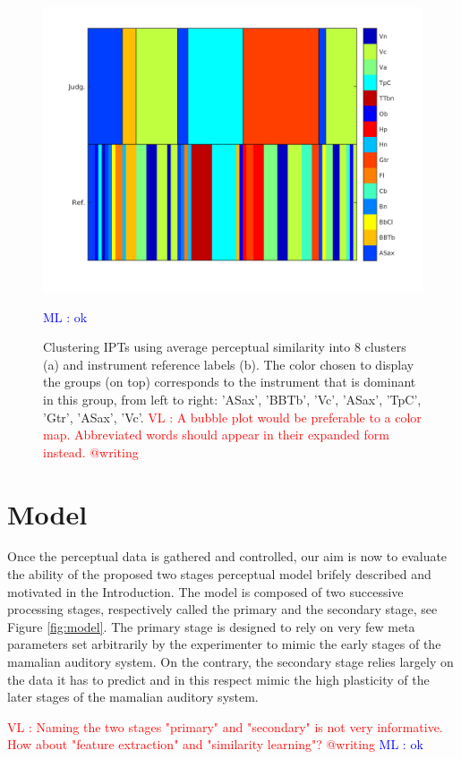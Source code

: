 \documentclass{article}
\newcommand{\ipts}{IPTs\xspace}
\newcommand{\ml}[1]{\textcolor{blue}{ML : #1}}
\newcommand{\vl}[1]{\textcolor{red}{VL : #1}}
\begin{document}
\begin{figure}
\center
\includegraphics[width = \textwidth]{figures/groupInstruments.png}
\caption{Clustering \ipts using average perceptual similarity into 8 clusters (a) and instrument reference labels (b). The color chosen to display the groups (on top) corresponds  to the instrument that is dominant in this group, from left to right: 'ASax', 'BBTb', 'Vc', 'ASax', 'TpC', 'Gtr', 'ASax', 'Vc'.
\vl{A bubble plot would be preferable to a color map. Abbreviated words should appear in their expanded form instead. @writing}}
\ml{ok}
\label{fig:gi}
\end{figure}

\section{Model}\label{sec:model}

Once the perceptual data is gathered and controlled, our aim is now to evaluate the ability of the proposed two stages perceptual model brifely described and motivated in the Introduction. The model is composed of two successive processing stages, respectively called the primary and the secondary stage, see Figure \ref{fig:model}. The primary stage is designed to rely on very few meta parameters set arbitrarily by the experimenter to mimic the early stages of the mamalian auditory system. On the contrary, the secondary stage relies largely on the data it has to predict and in this respect mimic the high plasticity of the later stages of the mamalian auditory system.

\vl{Naming the two stages "primary" and "secondary" is not very informative.
How about "feature extraction" and "similarity learning"? @writing}
\ml{ok}
\end{document}
